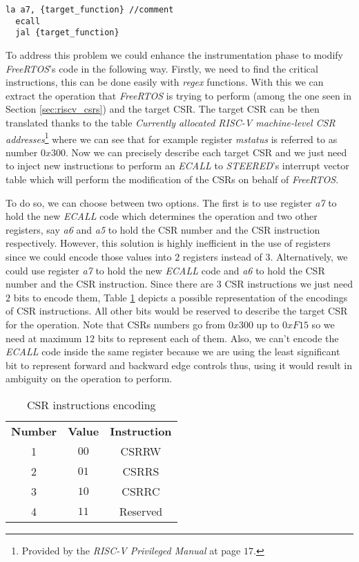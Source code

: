 \begin{lstlisting}[style=Assembly, caption = \textit{FreeRTOS} operations on Control and Status Registers, label={lst:freeoperations}]
  la a7, {target_function} //comment
  ecall
  jal {target_function}
\end{lstlisting}

To address this problem we could enhance the instrumentation phase to modify
\textit{FreeRTOS}'s code in the following way. Firstly, we need to find the critical
instructions, this can be done easily with \textit{regex} functions. With this
we can extract the operation that \textit{FreeRTOS} is trying to perform (among
the one seen in Section \ref{sec:riscv_csrs}) and the target CSR. The target CSR
can be then translated thanks to the table \textit{Currently allocated RISC-V
machine-level CSR addresses}\footnote{Provided by the \textit{RISC-V Privileged
Manual}\cite{riscv} at page $17$.} where we can see that for example register
\textit{mstatus} is referred to as number $0x300$. Now we can precisely describe
each target CSR and we just need to inject new instructions to perform an
\textit{ECALL} to \textit{STEERED}'s interrupt vector table which will perform
the modification of the CSRs on behalf of \textit{FreeRTOS}.

To do so, we can choose between two options. The first is to use register \textit{a7}
to hold the new \textit{ECALL} code which determines the operation and two other
registers, say \textit{a6} and \textit{a5} to hold the CSR number and the CSR
instruction respectively. However, this solution is highly inefficient in the
use of registers since we could encode those values into $2$ registers instead
of $3$. Alternatively, we could use register \textit{a7} to hold the new \textit{ECALL}
code and \textit{a6} to hold the CSR number and the CSR instruction. Since there
are $3$ CSR instructions we just need $2$ bits to encode them, Table \ref{tab:instructionenc}
depicts a possible representation of the encodings of CSR instructions. All
other bits would be reserved to describe the target CSR for the operation. Note that
CSRs numbers go from $0x300$ up to $0xF15$ so we need at maximum $12$ bits to represent
each of them. Also, we can't encode the \textit{ECALL} code inside the same
register because we are using the least significant bit to represent forward and
backward edge controls thus, using it would result in ambiguity on the operation
to perform.

\begin{table}
  \centering
  \begin{tabular}{|c|c|c|}
    \hline
    \textbf{Number} & \textbf{Value} & \textbf{Instruction} \\
    \hhline{===} 1  & $00$           & CSRRW                \\
    \hline
    2               & $01$           & CSRRS                \\
    \hline
    3               & $10$           & CSRRC                \\
    \hline
    4               & $11$           & Reserved             \\
    \hline
  \end{tabular}
  \caption{CSR instructions encoding}
  \label{tab:instructionenc}
\end{table}